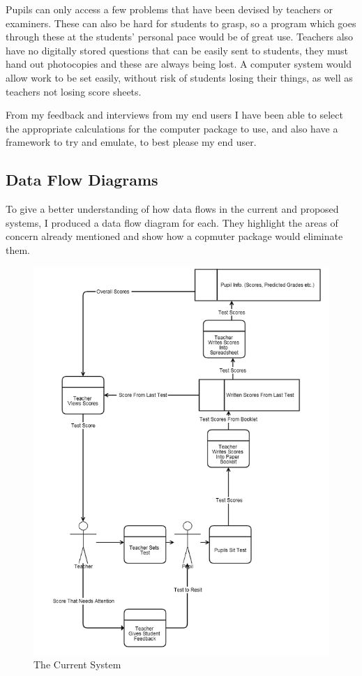\documentclass[a4paper,12pt]{report}
\begin{document}
Pupils can only access a few problems that have been devised by teachers or examiners. These can also be hard for students to grasp, so a program which goes through these at the students’ personal pace would be of great use. Teachers also have no digitally stored questions that can be easily sent to students, they must hand out photocopies and these are always being lost. A computer system would allow work to be set easily, without risk of students losing their things, as well as teachers not losing score sheets.\bigskip

From my feedback and interviews from my end users I have been able to select the appropriate calculations for the computer package to use, and also have a framework to try and emulate, to best please my end user.\\
\subsection{Data Flow Diagrams}
To give a better understanding of how data flows in the current and proposed systems, I produced a data flow diagram for each. They highlight the areas of concern already mentioned and show how a copmuter package would eliminate them.\\
\begin{figure}
\centering
\includegraphics[scale = 0.55]{CurrentSystem}
\caption{The Current System}
\label{fig:currentsystem}
\end{figure}
\end{document}
